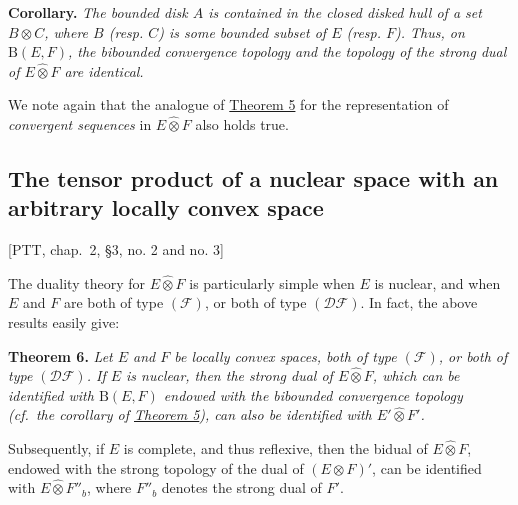 \documentclass[british]{article}
\newenvironment{itenv}[1]
  {\phantomsection\par\smallskip\noindent\textbf{#1.}\itshape}
  {\par\smallskip}
\begin{document}
\begin{itenv}{Corollary}
The bounded disk \(A\) is contained in the closed disked hull of a set
\(B\otimes C\), where \(B\) (resp. \(C\)) is some bounded subset of
\(E\) (resp. \(F\)). Thus, on \(\mathrm{B}(E,F)\), the bibounded
convergence topology and the topology of the strong dual of
\(E\hat{\otimes}F\) are identical.

\end{itenv}

We note again that the analogue of
\hyperref[section-2-theorem-5]{Theorem 5} for the representation of
\emph{convergent sequences} in \(E\hat{\otimes}F\) also holds true.

\subsection{The tensor product of a nuclear space with an arbitrary
locally convex space}\label{section-2.5}

{[}PTT, chap.~2, §3, no. 2 and no. 3{]}

The duality theory for \(E\hat{\otimes}F\) is particularly simple when
\(E\) is nuclear, and when \(E\) and \(F\) are both of type
\((\mathscr{F})\), or both of type \((\mathscr{DF})\). In fact, the
above results easily give:

\protect{}\label{section-2-theorem-6}
\begin{itenv}{Theorem 6}
Let \(E\) and \(F\) be locally convex spaces, both of type
\((\mathscr{F})\), or both of type \((\mathscr{DF})\). If \(E\) is
nuclear, then the strong dual of \(E\hat{\otimes}F\), which can be
identified with \(\mathrm{B}(E,F)\) endowed with the bibounded
convergence topology (cf.~the corollary of
\hyperref[section-2-theorem-5]{Theorem 5}), can also be identified with
\(E'\hat{\otimes}F'\).

\end{itenv}

Subsequently, if \(E\) is complete, and thus reflexive, then the bidual
of \(E\hat{\otimes}F\), endowed with the strong topology of the dual of
\((E\otimes F)'\), can be identified with \(E\hat{\otimes}F''_b\), where
\(F''_b\) denotes the strong dual of \(F'\).
\end{document}
